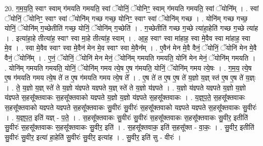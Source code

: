 \documentclass[17pt]{extarticle}
\begin{document}
20. ग॒म॒य॒ति॒ स्वाꣳ स्वाम् ग॑मयति गमयति॒ स्वां ॅयोनिं॒ ॅयोनिꣳ॒॒ स्वाम् ग॑मयति गमयति॒ स्वां ॅयोनि᳚म् । . स्वां ॅयोनिं॒ ॅयोनिꣳ॒॒ स्वाꣳ स्वां ॅयोनि॑म् गच्छ गच्छ॒ योनिꣳ॒॒ स्वाꣳ स्वां ॅयोनि॑म् गच्छ । . योनि॑म् गच्छ गच्छ॒ योनिं॒ ॅयोनि॑म् ग॒च्छेतीति॑ गच्छ॒ योनिं॒ ॅयोनि॑म् ग॒च्छेति॑ । . ग॒च्छेतीति॑ गच्छ ग॒च्छे त्या॑हा॒हेति॑ गच्छ ग॒च्छे त्या॑ह । . इत्या॑हा॒हे तीत्या॑ह॒ स्वाꣳ स्वा मा॒हे तीत्या॑ह॒ स्वाम् । . आ॒ह॒ स्वाꣳ स्वा मा॑हाह॒ स्वा मे॒वैव स्वा मा॑हाह॒ स्वा मे॒व । . स्वा मे॒वैव स्वाꣳ स्वा मे॒वैन॑ मेन मे॒व स्वाꣳ स्वा मे॒वैन᳚म् । . ए॒वैन॑ मेन मे॒वै वैनं॒ ॅयोनिं॒ ॅयोनि॑ मेन मे॒वै वैनं॒ ॅयोनि᳚म् । . ए॒नं॒ ॅयोनिं॒ ॅयोनि॑ मेन मेनं॒ ॅयोनि॑म् गमयति गमयति॒ योनि॑ मेन मेनं॒ ॅयोनि॑म् गमयति । . योनि॑म् गमयति गमयति॒ योनिं॒ ॅयोनि॑म् गमय त्ये॒ष ए॒ष ग॑मयति॒ योनिं॒ ॅयोनि॑म् गमय त्ये॒षः । . ग॒म॒य॒ त्ये॒ष ए॒ष ग॑मयति गमय त्ये॒ष ते॑ त ए॒ष ग॑मयति गमय त्ये॒ष ते᳚ । . ए॒ष ते॑ त ए॒ष ए॒ष ते॑ य॒ज्ञो य॒ज्ञ् स्त॑ ए॒ष ए॒ष ते॑ य॒ज्ञ्ः । . ते॒ य॒ज्ञो य॒ज्ञ् स्ते॑ ते य॒ज्ञो य॑ज्ञ्पते यज्ञ्पते य॒ज्ञ् स्ते॑ ते य॒ज्ञो य॑ज्ञ्पते । . य॒ज्ञो य॑ज्ञ्पते यज्ञ्पते य॒ज्ञो य॒ज्ञो य॑ज्ञ्पते स॒हसू᳚क्तवाकः स॒हसू᳚क्तवाको यज्ञ्पते य॒ज्ञो य॒ज्ञो य॑ज्ञ्पते स॒हसू᳚क्तवाकः । . य॒ज्ञ्॒प॒ते॒ स॒हसू᳚क्तवाकः स॒हसू᳚क्तवाको यज्ञ्पते यज्ञ्पते स॒हसू᳚क्तवाकः सु॒वीरः॑ सु॒वीरः॑ स॒हसू᳚क्तवाको यज्ञ्पते यज्ञ्पते स॒हसू᳚क्तवाकः सु॒वीरः॑ । . य॒ज्ञ्॒प॒त॒ इति॑ यज्ञ् - प॒ते॒ । . स॒हसू᳚क्तवाकः सु॒वीरः॑ सु॒वीरः॑ स॒हसू᳚क्तवाकः स॒हसू᳚क्तवाकः सु॒वीर॒ इतीति॑ सु॒वीरः॑ स॒हसू᳚क्तवाकः स॒हसू᳚क्तवाकः सु॒वीर॒ इति॑ । . स॒हसू᳚क्तवाक॒ इति॑ स॒हसू᳚क्त - वा॒कः॒ । . सु॒वीर॒ इतीति॑ सु॒वीरः॑ सु॒वीर॒ इत्या॑ हा॒हेति॑ सु॒वीरः॑ सु॒वीर॒ इत्या॑ह । . सु॒वीर॒ इति॑ सु - वीरः॑ । \newline
\end{document}
